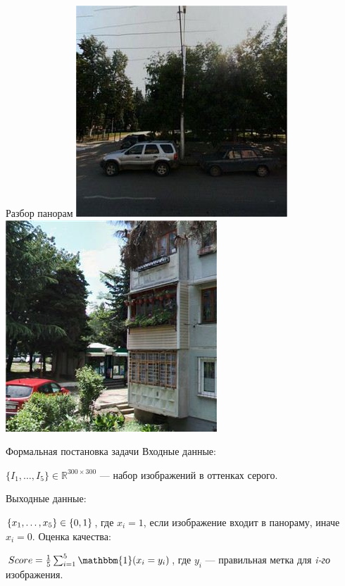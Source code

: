 \documentclass[14pt,mathserif,aspectratio=43]{beamer}
\begin{document}
\begin{frame}{Разбор панорам}
	\includegraphics[scale=0.25]{1_4.jpg}
	\includegraphics[scale=0.25]{1_5.jpg}


\end{frame}

\begin{frame}{Формальная постановка задачи}
    Входные данные: \\

    \medskip

    	$\{I_1, \dots, I_5\} \in \mathbb{R}^{300 \times 300}$ --- набор изображений в оттенках серого.

		\pause
	Выходные данные: \\

		\medskip

		$\{x_1, \dots, x_5\} \in \mathbb\{0, 1\}$, где $x_i = 1$, если изображение входит в панораму, иначе $x_i = 0$.
		\pause
	Оценка качества: \\	

		\medskip

		$Score = \frac{1}{5}\sum_{i=1}^5{\mathbbm{1}(x_i = y_i)}$, где $y_i$ --- правильная метка для \textit{i-го} изображения.

\end{frame}
\end{document}
